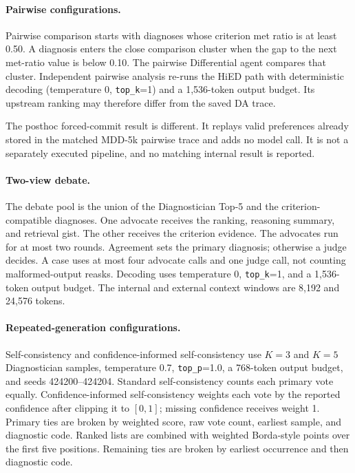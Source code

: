 \paragraph{Pairwise configurations.}
Pairwise comparison starts with diagnoses whose criterion met ratio is at least 0.50. A diagnosis enters the close comparison cluster when the gap to the next met-ratio value is below 0.10. The pairwise Differential agent compares that cluster. Independent pairwise analysis re-runs the HiED path with deterministic decoding (temperature 0, \texttt{top\_k}=1) and a 1,536-token output budget. Its upstream ranking may therefore differ from the saved DA trace.

The posthoc forced-commit result is different. It replays valid preferences already stored in the matched MDD-5k pairwise trace and adds no model call. It is not a separately executed pipeline, and no matching internal result is reported.

\paragraph{Two-view debate.}
The debate pool is the union of the Diagnostician Top-5 and the criterion-compatible diagnoses. One advocate receives the ranking, reasoning summary, and retrieval gist. The other receives the criterion evidence. The advocates run for at most two rounds. Agreement sets the primary diagnosis; otherwise a judge decides. A case uses at most four advocate calls and one judge call, not counting malformed-output reasks. Decoding uses temperature 0, \texttt{top\_k}=1, and a 1,536-token output budget. The internal and external context windows are 8,192 and 24,576 tokens.

\paragraph{Repeated-generation configurations.}
Self-consistency and confidence-informed self-consistency use $K=3$ and $K=5$ Diagnostician samples, temperature 0.7, \texttt{top\_p}=1.0, a 768-token output budget, and seeds 424200--424204. Standard self-consistency counts each primary vote equally. Confidence-informed self-consistency weights each vote by the reported confidence after clipping it to $[0,1]$; missing confidence receives weight 1. Primary ties are broken by weighted score, raw vote count, earliest sample, and diagnostic code. Ranked lists are combined with weighted Borda-style points over the first five positions. Remaining ties are broken by earliest occurrence and then diagnostic code.

